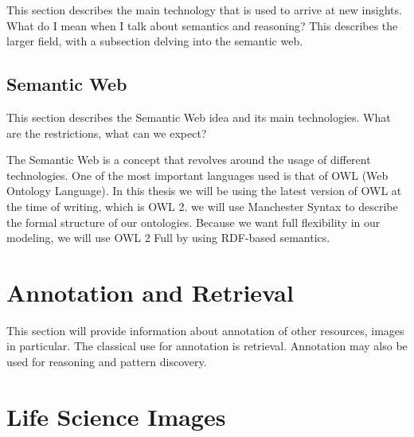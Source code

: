 This section describes the main technology that is used to arrive at
new insights. What do I mean when I talk about
semantics and
reasoning? This describes the larger field,
with a subsection delving into the semantic web.


\subsection{Semantic Web}

This section describes the Semantic Web
idea and its main technologies. What are the restrictions, what can we
expect?

The Semantic Web is a concept that revolves around the usage of
different technologies. One of the most important languages used is
that of OWL (Web Ontology Language). In this thesis we will
be using the latest version of OWL at the time of writing, which is
OWL 2. we will use Manchester Syntax to
describe the formal structure of our
ontologies. Because we want full flexibility in our
modeling, we will use OWL 2 Full by using RDF-based
semantics.




\section{Annotation and Retrieval}

This section will provide information about
annotation of other resources, images in
particular. The classical use for annotation is
retrieval. Annotation may also be used for
reasoning and pattern discovery.


\section{Life Science Images}

